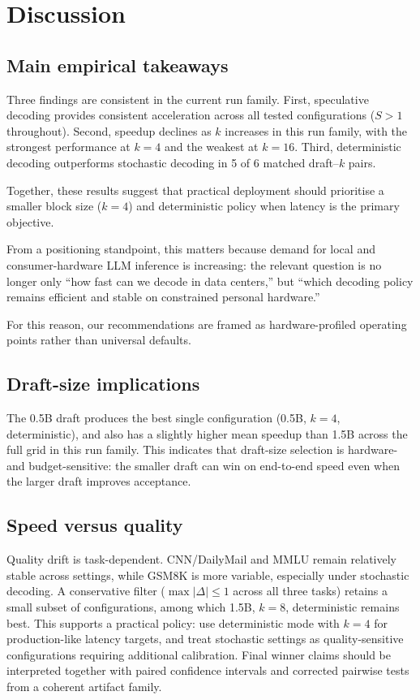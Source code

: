\section{Discussion}
\label{sec:discussion}

\subsection{Main empirical takeaways}

Three findings are consistent in the current run family. First, speculative decoding
provides consistent acceleration across all tested configurations
($S>1$ throughout). Second, speedup declines as $k$ increases in this run
family, with the strongest performance at $k{=}4$ and the weakest at
$k{=}16$. Third, deterministic decoding outperforms stochastic decoding in 5 of
6 matched draft--$k$ pairs.

Together, these results suggest that practical deployment should prioritise a
smaller block size ($k{=}4$) and deterministic policy when latency is the
primary objective.

From a positioning standpoint, this matters because demand for local and
consumer-hardware LLM inference is increasing: the relevant question is no
longer only ``how fast can we decode in data centers,'' but ``which decoding
policy remains efficient and stable on constrained personal hardware.''

For this reason, our recommendations are framed as hardware-profiled operating
points rather than universal defaults.

\subsection{Draft-size implications}

The 0.5B draft produces the best single configuration
(0.5B, $k{=}4$, deterministic), and also has a slightly higher mean speedup
than 1.5B across the full grid in this run family. This indicates that
draft-size selection is hardware- and budget-sensitive: the smaller draft can
win on end-to-end speed even when the larger draft improves acceptance.

\subsection{Speed versus quality}

Quality drift is task-dependent. CNN/DailyMail and MMLU remain relatively
stable across settings, while GSM8K is more variable, especially under
stochastic decoding. A conservative filter
($\max |\Delta| \le 1$ across all three tasks) retains a small subset of
configurations, among which 1.5B, $k{=}8$, deterministic remains best.
This supports a practical policy: use deterministic mode with $k{=}4$ for
production-like latency targets, and treat stochastic settings as
quality-sensitive configurations requiring additional calibration.
Final winner claims should be interpreted together with paired confidence
intervals and corrected pairwise tests from a coherent artifact family.

